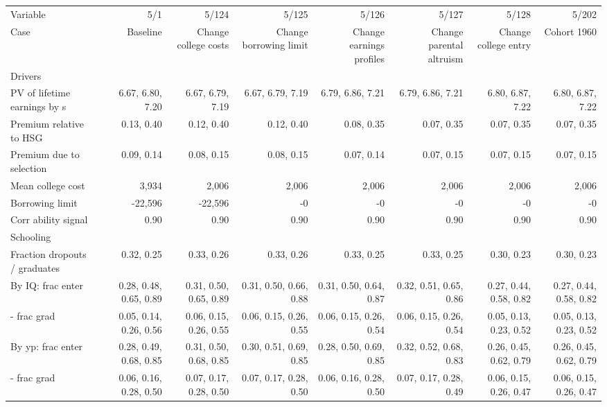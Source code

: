 \begin{tabular}{lrrrrrrr}
\hline
Variable & 5/1  & 5/124  & 5/125  & 5/126  & 5/127  & 5/128  & 5/202  \\ 
Case & Baseline  & Change college costs  & Change borrowing limit  & Change earnings profiles  & Change parental altruism  & Change college entry  & Cohort 1960  \\ 
Drivers &   &   &   &   &   &   &   \\ 
PV of lifetime earnings by s & 6.67, 6.80, 7.20  & 6.67, 6.79, 7.19  & 6.67, 6.79, 7.19  & 6.79, 6.86, 7.21  & 6.79, 6.86, 7.21  & 6.80, 6.87, 7.22  & 6.80, 6.87, 7.22  \\ 
Premium relative to HSG & 0.13, 0.40  & 0.12, 0.40  & 0.12, 0.40  & 0.08, 0.35  & 0.07, 0.35  & 0.07, 0.35  & 0.07, 0.35  \\ 
Premium due to selection & 0.09, 0.14  & 0.08, 0.15  & 0.08, 0.15  & 0.07, 0.14  & 0.07, 0.15  & 0.07, 0.15  & 0.07, 0.15  \\ 
Mean college cost & 3,934  & 2,006  & 2,006  & 2,006  & 2,006  & 2,006  & 2,006  \\ 
Borrowing limit & -22,596  & -22,596  & -0  & -0  & -0  & -0  & -0  \\ 
Corr ability signal & 0.90  & 0.90  & 0.90  & 0.90  & 0.90  & 0.90  & 0.90  \\ 
\hline
Schooling &   &   &   &   &   &   &   \\ 
Fraction dropouts / graduates & 0.32, 0.25  & 0.33, 0.26  & 0.33, 0.26  & 0.33, 0.25  & 0.33, 0.25  & 0.30, 0.23  & 0.30, 0.23  \\ 
By IQ: frac enter & 0.28, 0.48, 0.65, 0.89  & 0.31, 0.50, 0.65, 0.89  & 0.31, 0.50, 0.66, 0.88  & 0.31, 0.50, 0.64, 0.87  & 0.32, 0.51, 0.65, 0.86  & 0.27, 0.44, 0.58, 0.82  & 0.27, 0.44, 0.58, 0.82  \\ 
- frac grad & 0.05, 0.14, 0.26, 0.56  & 0.06, 0.15, 0.26, 0.55  & 0.06, 0.15, 0.26, 0.55  & 0.06, 0.15, 0.26, 0.54  & 0.06, 0.15, 0.26, 0.54  & 0.05, 0.13, 0.23, 0.52  & 0.05, 0.13, 0.23, 0.52  \\ 
By yp: frac enter & 0.28, 0.49, 0.68, 0.85  & 0.31, 0.50, 0.68, 0.85  & 0.30, 0.51, 0.69, 0.85  & 0.28, 0.50, 0.69, 0.85  & 0.32, 0.52, 0.68, 0.83  & 0.26, 0.45, 0.62, 0.79  & 0.26, 0.45, 0.62, 0.79  \\ 
- frac grad & 0.06, 0.16, 0.28, 0.50  & 0.07, 0.17, 0.28, 0.50  & 0.07, 0.17, 0.28, 0.50  & 0.06, 0.16, 0.28, 0.50  & 0.07, 0.17, 0.28, 0.49  & 0.06, 0.15, 0.26, 0.47  & 0.06, 0.15, 0.26, 0.47  \\ 

\end{tabular}
